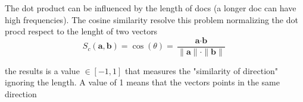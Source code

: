 

The dot product can be influenced by the length of docs (a longer doc can have high frequencies). The cosine similarity resolve this problem normalizing the dot procd respect to the lenght of two vectors
\[
    S_c (\textbf{a}, \textbf{b}) = \cos(\theta) = \frac{\textbf{a}\cdot\textbf{b}}{\|\textbf{a}\|\cdot\|\textbf{b}\|}
\]

the results is a value $\in[-1,1]$ that measures the "similarity of direction" ignoring the length. A value of 1 means that the vectors points in the same direction


